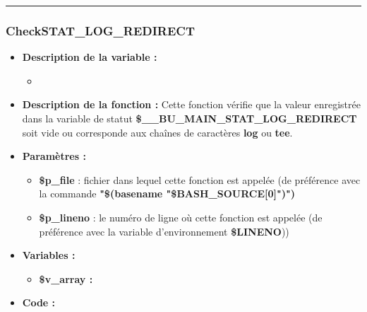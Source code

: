 \documentclass[a4paper,10pt]{article}
\begin{document}
\color{blue}\par\noindent\rule{\textwidth}{0.4pt}\color{white}

\color{blue}
\subsubsection{CheckSTAT\_LOG\_REDIRECT}\color{white}
\begin{itemize}
    \item \textbf{Description de la variable :}
    \begin{itemize}
        \item \textbf{}\\[1\baselineskip]
    \end{itemize}

    \item \textbf{Description de la fonction :} Cette fonction vérifie que la valeur enregistrée dans la variable de statut \textbf{\color{orange}\$\_\_BU\_MAIN\_STAT\_LOG\_REDIRECT} soit vide ou corresponde aux chaînes de caractères \textbf{log} ou \textbf{tee}.\\[1\baselineskip]

    \item \textbf{Paramètres :}
    \begin{itemize}
        \item \color{orange}\textbf{\$p\_file}\color{white} : fichier dans lequel cette fonction est appelée (de préférence avec la commande \textbf{"\$(\color{gray}basename \color{white}"\color{orange}\$BASH\_SOURCE[0]\color{white}")")}\\[1\baselineskip]

        \item \color{orange}\textbf{\$p\_lineno}\color{white} : le numéro de ligne où cette fonction est appelée (de préférence avec la variable d'environnement \textbf{\color{orange}\$LINENO}))\\[1\baselineskip]
    \end{itemize}

    \item \textbf{Variables :}
    \begin{itemize}
        \item \textbf{\color{orange}\$v\_array\color{white} :}\\[1\baselineskip]
    \end{itemize}

    \item \textbf{Code :}
\end{itemize}
\end{document}
